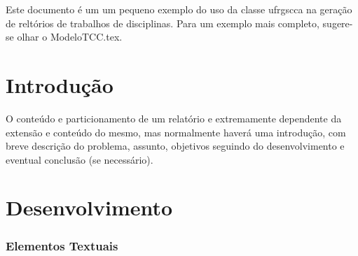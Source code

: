 \documentclass[repeatfields,xlists,xpacks,oneside]{ufrgscca}
\begin{document}





%


\begin{mainabstract}

Este documento é um um pequeno exemplo do uso da classe ufrgscca
na geração de reltórios de trabalhos de disciplinas.
Para um exemplo mais completo, sugere-se olhar o ModeloTCC.tex.

\end{mainabstract}





\chapter{Introdução}

O conteúdo e particionamento de um relatório e extremamente dependente da extensão e conteúdo do mesmo, mas normalmente haverá uma introdução, com breve descrição do problema, assunto, objetivos seguindo do desenvolvimento e eventual conclusão (se necessário).

\chapter{Desenvolvimento}
\label{partes}



\subsection{Elementos Textuais}
\end{document}
